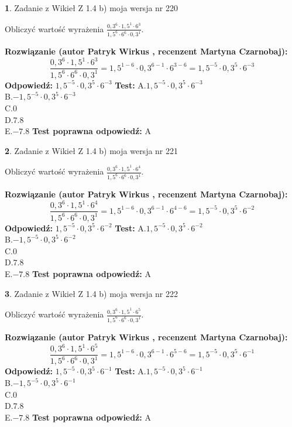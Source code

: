 \documentclass[12pt, a4paper]{article}
\theoremstyle{definition} %
\newtheorem{zad}{}
\newcommand{\zadStart}[1]{\begin{zad}#1\newline}
\newcommand{\zadStop}{\end{zad}}
\newcommand{\rozwStart}[2]{\noindent \textbf{Rozwiązanie (autor #1 , recenzent #2): }\newline}
\newcommand{\rozwStop}{\newline}
\newcommand{\odpStart}{\noindent \textbf{Odpowiedź:}\newline}
\newcommand{\odpStop}{\newline}
\newcommand{\testStart}{\noindent \textbf{Test:}\newline}
\newcommand{\testStop}{\newline}
\newcommand{\kluczStart}{\noindent \textbf{Test poprawna odpowiedź:}\newline}
\newcommand{\kluczStop}{\newline}
\begin{document}
\zadStart{Zadanie z Wikieł Z 1.4 b) moja wersja nr 220}

Obliczyć wartość wyrażenia $\frac{0,3^{6}\cdot1,5^{1}\cdot6^{3}}{1,5^{6}\cdot6^{6}\cdot0,3^{1}}$.
\zadStop
\rozwStart{Patryk Wirkus}{Martyna Czarnobaj}
$$\frac{0,3^{6}\cdot1,5^{1}\cdot6^{3}}{1,5^{6}\cdot6^{6}\cdot0,3^{1}} = 1,5^{1-6} \cdot 0,3^{6-1} \cdot 6^{3-6} = 1,5^{-5} \cdot 0,3^{5} \cdot 6^{-3}$$
\rozwStop
\odpStart
$1,5^{-5} \cdot 0,3^{5} \cdot 6^{-3}$
\odpStop
\testStart
A.$1,5^{-5} \cdot 0,3^{5} \cdot 6^{-3}$\\ B.$-1,5^{-5} \cdot 0,3^{5} \cdot 6^{-3}$\\ C.$0$\\ D.$7.8$\\ E.$-7.8$
\testStop
\kluczStart
A
\kluczStop



\zadStart{Zadanie z Wikieł Z 1.4 b) moja wersja nr 221}

Obliczyć wartość wyrażenia $\frac{0,3^{6}\cdot1,5^{1}\cdot6^{4}}{1,5^{6}\cdot6^{6}\cdot0,3^{1}}$.
\zadStop
\rozwStart{Patryk Wirkus}{Martyna Czarnobaj}
$$\frac{0,3^{6}\cdot1,5^{1}\cdot6^{4}}{1,5^{6}\cdot6^{6}\cdot0,3^{1}} = 1,5^{1-6} \cdot 0,3^{6-1} \cdot 6^{4-6} = 1,5^{-5} \cdot 0,3^{5} \cdot 6^{-2}$$
\rozwStop
\odpStart
$1,5^{-5} \cdot 0,3^{5} \cdot 6^{-2}$
\odpStop
\testStart
A.$1,5^{-5} \cdot 0,3^{5} \cdot 6^{-2}$\\ B.$-1,5^{-5} \cdot 0,3^{5} \cdot 6^{-2}$\\ C.$0$\\ D.$7.8$\\ E.$-7.8$
\testStop
\kluczStart
A
\kluczStop



\zadStart{Zadanie z Wikieł Z 1.4 b) moja wersja nr 222}

Obliczyć wartość wyrażenia $\frac{0,3^{6}\cdot1,5^{1}\cdot6^{5}}{1,5^{6}\cdot6^{6}\cdot0,3^{1}}$.
\zadStop
\rozwStart{Patryk Wirkus}{Martyna Czarnobaj}
$$\frac{0,3^{6}\cdot1,5^{1}\cdot6^{5}}{1,5^{6}\cdot6^{6}\cdot0,3^{1}} = 1,5^{1-6} \cdot 0,3^{6-1} \cdot 6^{5-6} = 1,5^{-5} \cdot 0,3^{5} \cdot 6^{-1}$$
\rozwStop
\odpStart
$1,5^{-5} \cdot 0,3^{5} \cdot 6^{-1}$
\odpStop
\testStart
A.$1,5^{-5} \cdot 0,3^{5} \cdot 6^{-1}$\\ B.$-1,5^{-5} \cdot 0,3^{5} \cdot 6^{-1}$\\ C.$0$\\ D.$7.8$\\ E.$-7.8$
\testStop
\kluczStart
A
\kluczStop
\end{document}
